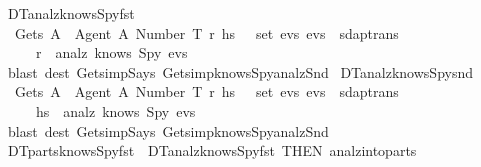\begin{isabellebody}
\begin{isamarkuptext}
  \end{isamarkuptext}\isamarkuptrue%
  \isamarkupfalse%
  \ DT{}{\isacharunderscore}analz{\isacharunderscore}knows{\isacharunderscore}Spy{\isacharunderscore}fst\ {\isacharcolon}\isanewline
  \ {\isachardoublequoteopen}{\isasymlbrakk}\ Gets\ A\ {\isasymlbrace}\ {\isasymlbrace}Agent\ A{\isacharcomma}\ Number\ T{\isasymrbrace}{\isacharcomma}\ r{\isacharprime}{\isacharcomma}\ h\isactrlsub s\ {\isasymrbrace}\ {\isasymin}\ set\ evs{\isacharsemicolon}\ evs\ {\isasymin}\ sdaptrans\ {\isasymrbrakk}\isanewline
  \ \ \ \ {\isasymLongrightarrow}\ r{\isacharprime}\ {\isasymin}\ analz\ {\isacharparenleft}knows\ Spy\ evs{\isacharparenright}{\isachardoublequoteclose}\isanewline
  \isadelimproof
  \endisadelimproof
  \isatagproof
  \isamarkupfalse%
  \ {\isacharparenleft}blast\ dest{\isacharbang}{\isacharcolon}\ Gets{\isacharunderscore}imp{\isacharunderscore}Says\ Gets{\isacharunderscore}imp{\isacharunderscore}knows{\isacharunderscore}Spy{\isacharunderscore}analz{\isacharunderscore}Snd{\isacharparenright}%
  \endisatagproof
  {\isafoldproof}%
  \isadelimproof
  \isanewline
  \endisadelimproof
  \isanewline
  \isamarkupfalse%
  \ DT{}{\isacharunderscore}analz{\isacharunderscore}knows{\isacharunderscore}Spy{\isacharunderscore}snd\ {\isacharcolon}\isanewline
  \ {\isachardoublequoteopen}{\isasymlbrakk}\ Gets\ A\ {\isasymlbrace}\ {\isasymlbrace}Agent\ A{\isacharcomma}\ Number\ T{\isasymrbrace}{\isacharcomma}\ r{\isacharprime}{\isacharcomma}\ h\isactrlsub s\ {\isasymrbrace}\ {\isasymin}\ set\ evs{\isacharsemicolon}\ evs\ {\isasymin}\ sdaptrans\ {\isasymrbrakk}\isanewline
  \ \ \ \ {\isasymLongrightarrow}\ h\isactrlsub s\ {\isasymin}\ analz\ {\isacharparenleft}knows\ Spy\ evs{\isacharparenright}{\isachardoublequoteclose}\isanewline
  \isadelimproof
  \endisadelimproof
  \isatagproof
  \isamarkupfalse%
  \ {\isacharparenleft}blast\ dest{\isacharbang}{\isacharcolon}\ Gets{\isacharunderscore}imp{\isacharunderscore}Says\ Gets{\isacharunderscore}imp{\isacharunderscore}knows{\isacharunderscore}Spy{\isacharunderscore}analz{\isacharunderscore}Snd{\isacharparenright}%
  \endisatagproof
  {\isafoldproof}%
  \isadelimproof
  \isanewline
  \endisadelimproof
  \isanewline
  \isamarkupfalse%
  \ DT{}{\isacharunderscore}parts{\isacharunderscore}knows{\isacharunderscore}Spy{\isacharunderscore}fst\ {\isacharequal}\ DT{}{\isacharunderscore}analz{\isacharunderscore}knows{\isacharunderscore}Spy{\isacharunderscore}fst\ {\isacharbrackleft}THEN\ analz{\isacharunderscore}into{\isacharunderscore}parts{\isacharbrackright}\isanewline

\end{isabellebody}
